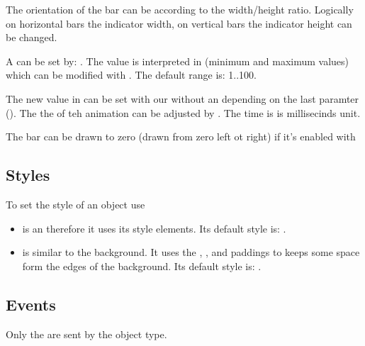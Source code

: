 \documentclass[letterpaper,10pt,english]{sphinxmanual}
\begin{document}
The orientation of the bar can be  according to the width/height ratio. Logically on horizontal bars the indicator width, on vertical bars the indicator height can be changed.

A  can be set by: .
The value is interpreted in  (minimum and maximum values) which can be modified with .
The default range is: 1..100.

The new value in  can be set with our without an  depending on the last paramter ().
The the of teh animation can be adjusted by . The time is is  millisecinds unit.

The bar can be drawn  to zero (drawn from zero left ot right) if it’s enabled with 


\subsection{Styles}
\label{\detokenize{object-types/bar:styles}}
To set the style of an  object use 
\begin{itemize}
\item {} 
 is an {\hyperref[\detokenize{object-types/obj::doc}]{}} therefore it uses its style elements. Its default style is: .

\item {} 
 is similar to the background. It uses the , ,  and  paddings to keeps some space form the edges of the background. Its default style is: .

\end{itemize}


\subsection{Events}
\label{\detokenize{object-types/bar:events}}
Only the  are sent by the object type.
\end{document}
